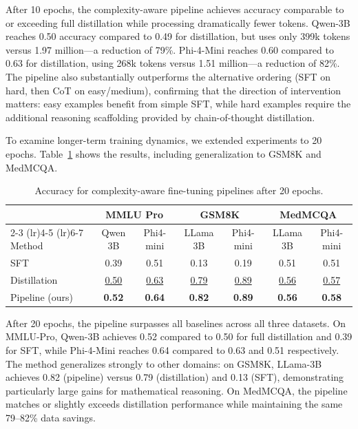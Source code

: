 After 10 epochs, the complexity-aware pipeline achieves accuracy comparable to or exceeding full distillation while processing dramatically fewer tokens. Qwen-3B reaches 0.50 accuracy compared to 0.49 for distillation, but uses only 399k tokens versus 1.97 million---a reduction of 79\%. Phi-4-Mini reaches 0.60 compared to 0.63 for distillation, using 268k tokens versus 1.51 million---a reduction of 82\%. The pipeline also substantially outperforms the alternative ordering (SFT on hard, then CoT on easy/medium), confirming that the direction of intervention matters: easy examples benefit from simple SFT, while hard examples require the additional reasoning scaffolding provided by chain-of-thought distillation.

To examine longer-term training dynamics, we extended experiments to 20 epochs. Table~\ref{tab:finetuning_20epochs} shows the results, including generalization to GSM8K and MedMCQA.

\begin{table}[!htb]
    \centering
    \caption{Accuracy for complexity-aware fine-tuning pipelines after 20 epochs.}
    \begin{tabular}{lcccccc}
    \toprule
    & \multicolumn{2}{c}{MMLU Pro} & \multicolumn{2}{c}{GSM8K} & \multicolumn{2}{c}{MedMCQA} \\
    \cmidrule(lr){2-3} \cmidrule(lr){4-5} \cmidrule(lr){6-7}
    Method & Qwen 3B & Phi4-mini & LLama 3B & Phi4-mini & LLama 3B & Phi4-mini \\
    \midrule
    SFT & 0.39 & 0.51 & 0.13 & 0.19 & 0.51 & 0.51 \\
    Distillation & \underline{0.50} & \underline{0.63} & \underline{0.79} & \underline{0.89} & \underline{0.56} & \underline{0.57} \\
    Pipeline (ours) & \textbf{0.52} & \textbf{0.64} & \textbf{0.82} & \textbf{0.89} & \textbf{0.56} & \textbf{0.58} \\
    \bottomrule
    \end{tabular}
    \label{tab:finetuning_20epochs}
\end{table}

After 20 epochs, the pipeline surpasses all baselines across all three datasets. On MMLU-Pro, Qwen-3B achieves 0.52 compared to 0.50 for full distillation and 0.39 for SFT, while Phi-4-Mini reaches 0.64 compared to 0.63 and 0.51 respectively. The method generalizes strongly to other domains: on GSM8K, LLama-3B achieves 0.82 (pipeline) versus 0.79 (distillation) and 0.13 (SFT), demonstrating particularly large gains for mathematical reasoning. On MedMCQA, the pipeline matches or slightly exceeds distillation performance while maintaining the same 79--82\% data savings.

